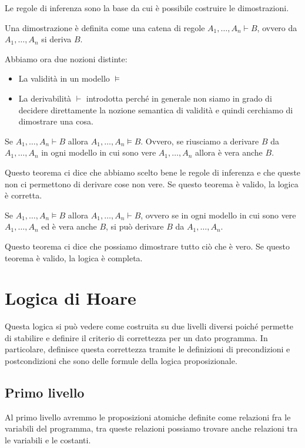 Le regole di inferenza sono la base da cui è possibile costruire le dimostrazioni.
\begin{definizione}
    Una dimostrazione è definita come una catena di regole $A_1,\dots, A_n \vdash B$,
    ovvero da $A_1, \dots, A_n$ si deriva $B$.
\end{definizione}
Abbiamo ora due nozioni distinte:
\begin{itemize}
    \item La validità in un modello $\models$
    \item La derivabilità $\vdash$ introdotta perché in generale non siamo in grado
          di decidere direttamente la nozione semantica di validità e quindi
          cerchiamo di dimostrare una cosa.
\end{itemize}
\begin{teorema}
    Se $A_1, \dots, A_n \vdash B$ allora $A_1, \dots, A_n \models B$. Ovvero, se
    riusciamo a derivare $B$ da $A_1, \dots, A_n$ in ogni modello in cui sono
    vere $A_1, \dots, A_n$ allora è vera anche $B$.
\end{teorema}
Questo teorema ci dice che abbiamo scelto bene le regole di inferenza e che queste
non ci permettono di derivare cose non vere. Se questo teorema è valido, la
logica è corretta.
\begin{teorema}
    Se $A_1, \dots, A_n \models B$ allora $A_1, \dots, A_n \vdash B$, ovvero se
    in ogni modello in cui sono vere $A_1, \dots, A_n$ ed è vera anche $B$, si
    può derivare $B$ da $A_1, \dots, A_n$.
\end{teorema}
Questo teorema ci dice che possiamo dimostrare tutto ciò che è vero. Se questo
teorema è valido, la logica è completa.
\section{Logica di Hoare}
Questa logica si può vedere come costruita su due livelli diversi poiché permette
di stabilire e definire il criterio di correttezza per un dato programma.
In particolare, definisce questa correttezza tramite le definizioni di precondizioni
e postcondizioni che sono delle formule della logica proposizionale.
\subsection{Primo livello}
Al primo livello avremmo le proposizioni atomiche definite come relazioni fra le
variabili del programma, tra queste relazioni possiamo trovare anche relazioni
tra le variabili e le costanti.

